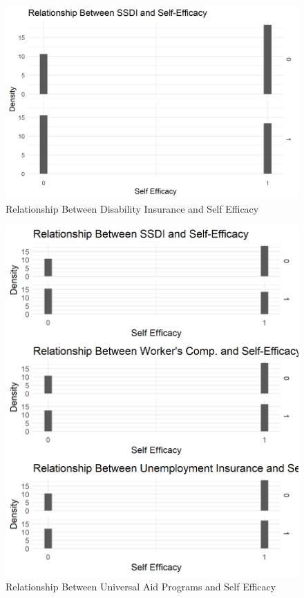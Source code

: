\documentclass[12pt]{paper}
\begin{document}
\begin{figure}[H]
	\includegraphics[scale=0.7]{Figs/disability_SE.png} \centering
	\caption{Relationship Between Disability Insurance and Self Efficacy}
	\label{}
\end{figure}

\begin{figure}[H]
	\includegraphics[scale=0.7]{Figs/uni_SE.png} \centering
	\caption{Relationship Between Universal Aid Programs and Self Efficacy}
	\label{}
\end{figure}
\end{document}

